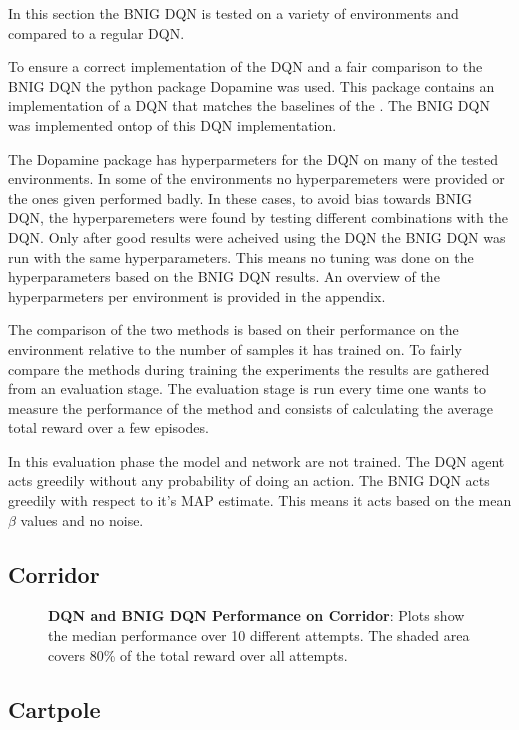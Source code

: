 In this section the BNIG DQN is tested on a variety of environments and compared to a regular DQN. 

To ensure a correct implementation of the DQN and a fair comparison to the BNIG DQN the python package Dopamine\citep{castro_18} was used. This package contains an implementation of a DQN that matches the baselines of the \cite{mnih_2015}. The BNIG DQN was implemented ontop of this DQN implementation.

The Dopamine package has hyperparmeters for the DQN on many of the tested environments. In some of the environments no hyperparemeters were provided or the ones given performed badly. In these cases, to avoid bias towards BNIG DQN, the hyperparemeters were found by testing different combinations with the DQN. Only after good results were acheived using the DQN the BNIG DQN was run with the same hyperparameters. This means no tuning was done on the hyperparameters based on the BNIG DQN results. An overview of the hyperparmeters per environment is provided in the appendix.

The comparison of the two methods is based on their performance on the environment relative to the number of samples it has trained on. To fairly compare the methods during training the experiments the results are gathered from an evaluation stage. The evaluation stage is run every time one wants to measure the performance of the method and consists of calculating the average total reward over a few episodes.

In this evaluation phase the model and network are not trained. The DQN agent acts greedily without any probability of doing an action. The BNIG DQN acts greedily with respect to it's MAP estimate. This means it acts based on the mean $\beta$ values and no noise.

\subsection{Corridor}

\begin{figure}[H]
    \centering
    \caption{\textbf{DQN and BNIG DQN Performance on Corridor}: Plots show the median performance over 10 different attempts. The shaded area covers 80\% of the total reward over all attempts.}
    \label{fig:nn_cartpole}
\end{figure}
\subsection{Cartpole}

